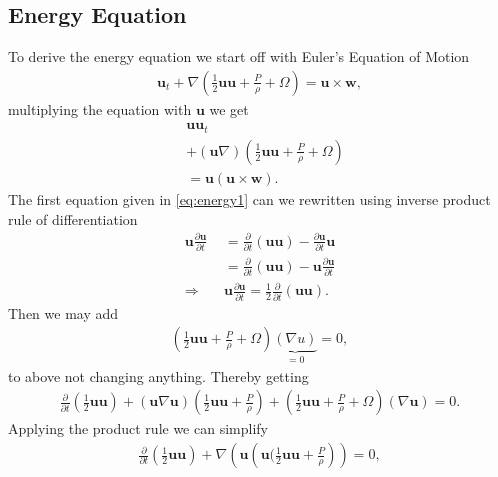 \subsection{Energy Equation}
To derive the energy equation we start off with Euler's Equation of Motion
\begin{align}
  \mathbf{u} _t + \nabla
  (\frac{1}{2}\mathbf{u}\mathbf{u}+\frac{P}{\rho}+\Omega) = \mathbf{u}\times
  \mathbf{w},
\end{align}
multiplying the equation with $\mathbf{u}$ we get
\begin{align}
  &\mathbf{u}\mathbf{u} _t \label{eq:energy1} \\
  &+(\mathbf{u}\nabla)(\frac{1}{2}\mathbf{u}\mathbf{u}+\frac{P}{\rho}+\Omega)\label{eq:energy2}\\
  &= \mathbf{u}(\mathbf{u}\times
  \mathbf{w})\label{eq:energy3}.
\end{align}
The first equation given in \ref{eq:energy1} can we rewritten using inverse
product rule of differentiation
\begin{align}
    \mathbf{u}\frac{\partial \mathbf{u}}{\partial t}
    &= \frac{\partial
    }{\partial t} (\mathbf{u}\mathbf{u}) - \frac{\partial \mathbf{u}}{\partial t}
    \mathbf{u} \\
    &= \frac{\partial
    }{\partial t} (\mathbf{u}\mathbf{u}) - \mathbf{u}\frac{\partial
    \mathbf{u}}{\partial t}\\
    \Rightarrow\quad & \mathbf{u} \frac{\partial \mathbf{u}}{\partial t}  =
    \frac{1}{2}\frac{\partial }{\partial t} (\mathbf{u}\mathbf{u}).
\end{align}
Then we may add
\begin{align}
    \left(\frac{1}{2} \mathbf{u}\mathbf{u}+\frac{P}{\rho} +\Omega  \right)
    \underbrace{(\nabla u)}_{=0} = 0,
\end{align}
to above not changing anything. Thereby getting
\begin{align}
    \frac{\partial }{\partial t} (\frac{1}{2}\mathbf{u}\mathbf{u})
    +(\mathbf{u}\nabla \mathbf{u})\left(
    \frac{1}{2}\mathbf{u}\mathbf{u}+\frac{P}{\rho} \right)
    +\left( \frac{1}{2}\mathbf{u}\mathbf{u}+\frac{P}{\rho} + \Omega \right)
    (\nabla \mathbf{u}) = 0.
\end{align}
Applying the product rule we can simplify
\begin{align}
    \frac{\partial }{\partial t} \left(\frac{1}{2}\mathbf{u}\mathbf{u}\right)
    +\nabla \left(\mathbf{u}\left(\mathbf{u}(
    \frac{1}{2}\mathbf{u}\mathbf{u}+\frac{P}{\rho}\right) \right) = 0,
\end{align}

